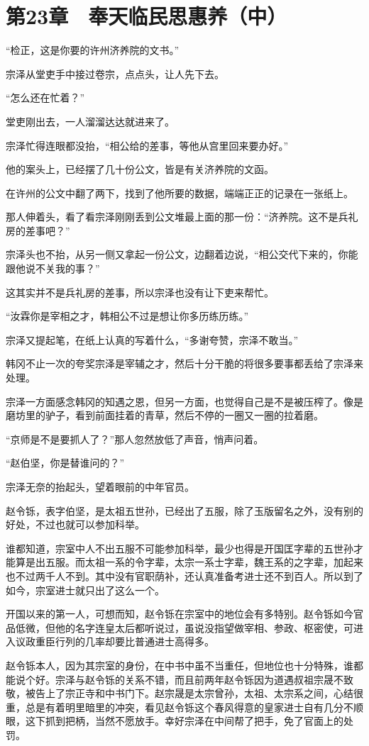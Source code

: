 \section{第23章　奉天临民思惠养（中）}

“检正，这是你要的许州济养院的文书。”

宗泽从堂吏手中接过卷宗，点点头，让人先下去。

“怎么还在忙着？”

堂吏刚出去，一人溜溜达达就进来了。

宗泽忙得连眼都没抬，“相公给的差事，等他从宫里回来要办好。”

他的案头上，已经摆了几十份公文，皆是有关济养院的文函。

在许州的公文中翻了两下，找到了他所要的数据，端端正正的记录在一张纸上。

那人伸着头，看了看宗泽刚刚丢到公文堆最上面的那一份：“济养院。这不是兵礼房的差事吧？”

宗泽头也不抬，从另一侧又拿起一份公文，边翻着边说，“相公交代下来的，你能跟他说不关我的事？”

这其实并不是兵礼房的差事，所以宗泽也没有让下吏来帮忙。

“汝霖你是宰相之才，韩相公不过是想让你多历练历练。”

宗泽又提起笔，在纸上认真的写着什么，“多谢夸赞，宗泽不敢当。”

韩冈不止一次的夸奖宗泽是宰辅之才，然后十分干脆的将很多要事都丢给了宗泽来处理。

宗泽一方面感念韩冈的知遇之恩，但另一方面，也觉得自己是不是被压榨了。像是磨坊里的驴子，看到前面挂着的青草，然后不停的一圈又一圈的拉着磨。

“京师是不是要抓人了？”那人忽然放低了声音，悄声问着。

“赵伯坚，你是替谁问的？”

宗泽无奈的抬起头，望着眼前的中年官员。

赵令铄，表字伯坚，是太祖五世孙，已经出了五服，除了玉版留名之外，没有别的好处，不过也就可以参加科举。

谁都知道，宗室中人不出五服不可能参加科举，最少也得是开国匡字辈的五世孙才能算是出五服。而太祖一系的令字辈，太宗一系士字辈，魏王系的之字辈，加起来也不过两千人不到。其中没有官职荫补，还认真准备考进士还不到百人。所以到了如今，宗室进士就只出了这么一个。

开国以来的第一人，可想而知，赵令铄在宗室中的地位会有多特别。赵令铄如今官品低微，但他的名字连皇太后都听说过，虽说没指望做宰相、参政、枢密使，可进入议政重臣行列的几率却要比普通进士高得多。

赵令铄本人，因为其宗室的身份，在中书中虽不当重任，但地位也十分特殊，谁都能说个好。宗泽与赵令铄的关系不错，而且前两年赵令铄因为道遇叔祖宗晟不致敬，被告上了宗正寺和中书门下。赵宗晟是太宗曾孙，太祖、太宗系之间，心结很重，总是有着明里暗里的冲突，看见赵令铄这个春风得意的皇家进士自有几分不顺眼，这下抓到把柄，当然不愿放手。幸好宗泽在中间帮了把手，免了官面上的处罚。

